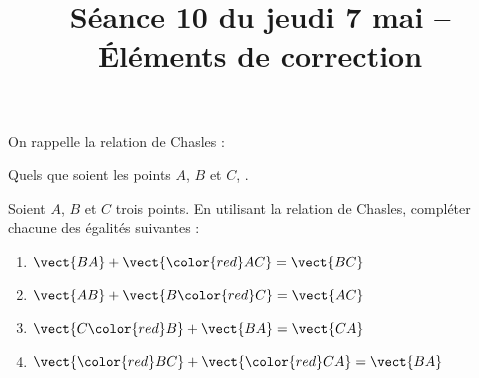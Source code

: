 \documentclass[a4paper]{tufte-handout}
\begin{document}
\title{Séance 10 du jeudi 7 mai -- Éléments de correction}

\pagestyle{empty}

\date{}

\maketitle{}

\begin{fullwidth}
  {\color{red}On rappelle la relation de Chasles :
    \begin{center}
      Quels que soient les points $A$, $B$ et $C$, .
    \end{center}
  }
\end{fullwidth}

\bigskip

\begin{fullwidth}
  \exo Soient $A$, $B$ et $C$ trois points. En utilisant la relation de Chasles, compléter chacune des égalités suivantes :
  \begin{multicols}{4}
    \begin{enumerate}
      \item $\vect{BA}+\vect{{\color{red}A} C}=\vect{BC}$
      \item $\vect{AB}+\vect{B{\color{red}C}}=\vect{AC}$
      \item $\vect{C{\color{red}B}}+\vect{BA}=\vect{CA}$
      \item $\vect{{\color{red}B} C}+\vect{{\color{red}C} A}=\vect{BA}$
    \end{enumerate}
  \end{multicols}
\end{fullwidth}

\bigskip
\end{document}
